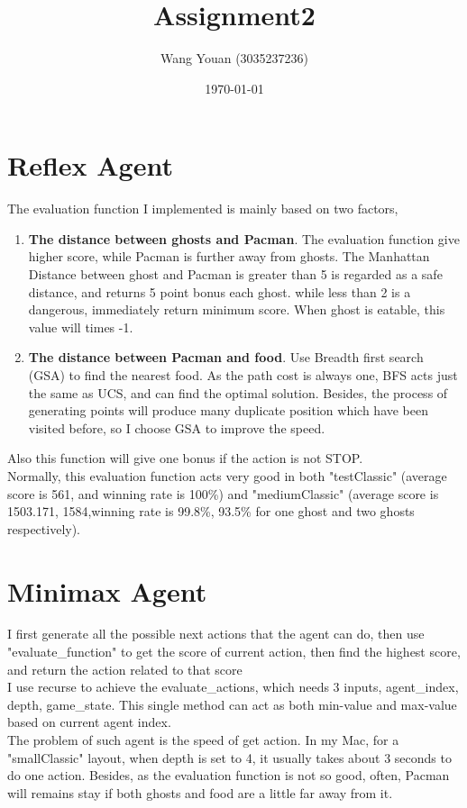 \documentclass{article}
\title{Assignment2}
\author{Wang Youan (3035237236)}
\date{\today}
\begin{document}
	\maketitle
	\section{Reflex Agent}
	\label{sec:Q1}
	The evaluation function I implemented is mainly based on two factors,
	\begin{enumerate}
		\item \textbf{The distance between ghosts and Pacman}. The evaluation function give higher score, while Pacman is further away from ghosts. The Manhattan Distance between ghost and Pacman is greater than 5 is regarded as a safe distance, and returns 5 point bonus each ghost. while less than 2 is a dangerous, immediately return minimum score. When ghost is eatable, this value will times -1. 
		\item \textbf{The distance between Pacman and food}. Use Breadth first search (GSA) to find the nearest food. As the path cost is always one, BFS acts just the same as UCS, and can find the optimal solution. Besides, the process of generating points will produce many duplicate position which have been visited before, so I choose GSA to improve the speed. 
	\end{enumerate}
	Also this function will give one bonus if the action is not STOP.\\
	Normally, this evaluation function acts very good in both "testClassic" (average score is 561, and winning rate is 100\%) and "mediumClassic" (average score is 1503.171, 1584,winning rate is 99.8\%, 93.5\% for one ghost and two ghosts respectively).
	\section{Minimax Agent}
	\label{sec:Q2}
	I first generate all the possible next actions that the agent can do, then use "evaluate\_function" to get the score of current action, then find the highest score, and return the action related to that score\\
	I use recurse to achieve the evaluate\_actions, which needs 3 inputs, agent\_index, depth, game\_state. This single method can act as both min-value and max-value based on current agent index.\\
	The problem of such agent is the speed of get action. In my Mac, for a "smallClassic" layout, when depth is set to 4, it usually takes about 3 seconds to do one action. Besides, as the evaluation function is not so good, often, Pacman will remains stay if both ghosts and food are a little far away from it.
\end{document}
